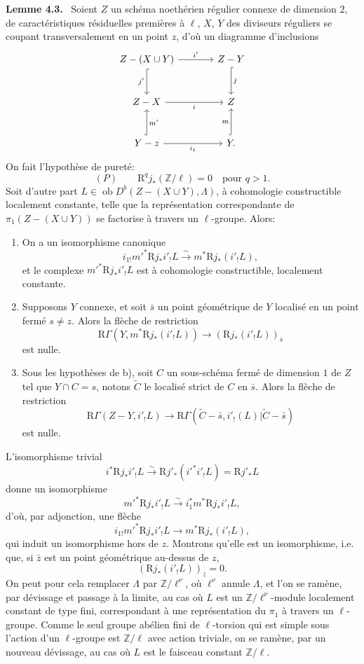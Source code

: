 \documentclass[11pt]{article}
\newenvironment{statement}[1]{\par\medskip\noindent\textbf{#1.}\ }{\par\medskip}
\newcommand{\R}{\mathrm{R}}\newcommand{\RHomCore}{\mathrm{RHom}}
\providecommand{\Ob}{\operatorname{ob}}
\providecommand{\Ob}{\operatorname{ob}}
\providecommand{\R}{\mathrm R}
\providecommand{\Ob}{\operatorname{Ob}}
\providecommand{\Ob}{\operatorname{ob}}
\providecommand{\Ob}{\operatorname{Ob}}
\begin{document}
\begin{statement}{Lemme 4.3}
Soient $Z$ un schéma noethérien régulier connexe de dimension $2$, de caractéristiques résiduelles premières à $\ell$, $X$, $Y$ des diviseurs réguliers se coupant transversalement en un point $z$, d'où un diagramme d'inclusions
\[
\begin{tikzcd}[column sep=large,row sep=large]
Z-(X\cup Y) \arrow[r,"i'"] \arrow[d,hook,"j'"'] & Z-Y \arrow[d,hook,"j"]\\
Z-X \arrow[r,"i"'] & Z\\
Y-z \arrow[r,"i_1"'] \arrow[u,hook,"m'"'] & Y \arrow[u,hook,"m"] .
\end{tikzcd}
\]
On fait l'hypothèse de pureté:
\[
(P)\qquad \R^qj_*(\mathbb Z/\ell)=0\quad\text{pour }q>1.
\]
Soit d'autre part $L\in\Ob D^b(Z-(X\cup Y),\Lambda)$, à cohomologie constructible localement constante, telle que la représentation correspondante de $\pi_1(Z-(X\cup Y))$ se factorise à travers un $\ell$-groupe. Alors:
\begin{enumerate}[label=\alph*)]
\item On a un isomorphisme canonique
\[
i_{1!}m'^*\R j_*i'_!L\xrightarrow{\sim} m^*\R j_*(i'_!L),
\]
et le complexe $m'^*\R j_*i'_!L$ est à cohomologie constructible, localement constante.
\item Supposons $Y$ connexe, et soit $\bar s$ un point géométrique de $Y$ localisé en un point fermé $s\ne z$. Alors la flèche de restriction
\begin{equation}
\R\Gamma(Y,m^*\R j_*(i'_!L))\longrightarrow (\R j_*(i'_!L))_{\bar s}
\tag{4.3.1}
\end{equation}
est nulle.
\item Sous les hypothèses de b), soit $C$ un sous-schéma fermé de dimension $1$ de $Z$ tel que $Y\cap C=s$, notons $\widetilde C$ le localisé strict de $C$ en $\bar s$. Alors la flèche de restriction
\begin{equation}
\R\Gamma(Z-Y,i'_!L)
\longrightarrow
\R\Gamma(\widetilde C-\bar s,i'_!(L)|\widetilde C-\bar s)
\tag{4.3.2}
\end{equation}
est nulle.
\end{enumerate}
\end{statement}

L'isomorphisme trivial
\[
i^*\R j_*i'_!L\xrightarrow{\sim}\R j'_*(i'^*i'_!L)=\R j'_*L
\]
donne un isomorphisme
\[
m'^*\R j_*i'_!L\xrightarrow{\sim} i_1^*m^*\R j_*i'_!L,
\]
d'où, par adjonction, une flèche
\[
i_{1!}m'^*\R j_*i'_!L\longrightarrow m^*\R j_*(i'_!L),
\]
qui induit un isomorphisme hors de $z$. Montrons qu'elle est un isomorphisme, i.e. que, si $\bar z$ est un point géométrique au-dessus de $z$,
\[
(\R j_*(i'_!L))_{\bar z}=0.
\]
On peut pour cela remplacer $\Lambda$ par $\mathbb Z/\ell^\nu$, où $\ell^\nu$ annule $\Lambda$, et l'on se ramène, par dévissage et passage à la limite, au cas où $L$ est un $\mathbb Z/\ell^\nu$-module localement constant de type fini, correspondant à une représentation du $\pi_1$ à travers un $\ell$-groupe. Comme le seul groupe abélien fini de $\ell$-torsion qui est simple sous l'action d'un $\ell$-groupe est $\mathbb Z/\ell$ avec action triviale, on se ramène, par un nouveau dévissage, au cas où $L$ est le faisceau constant $\mathbb Z/\ell$.
\end{document}
